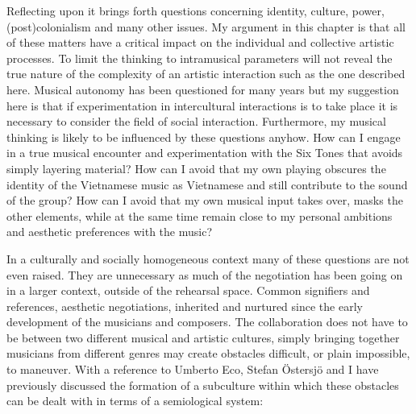 \documentclass[a4paper]{article}
\begin{document}
Reflecting upon it brings forth questions concerning identity, culture, power, (post)colonialism and many other issues. My argument in this chapter is that all of these matters have a critical impact on the individual and collective artistic processes. To limit the thinking to intramusical parameters will not reveal the true nature of the complexity of an artistic interaction such as the one described here. Musical autonomy has been questioned for many years but my suggestion here is that if experimentation in intercultural interactions is to take place it is necessary to consider the field of social interaction.
Furthermore, my musical thinking is likely to be influenced by these questions anyhow. How can I engage in a true musical encounter and experimentation with the Six Tones that avoids simply layering material?
How can I avoid that my own playing obscures the identity of the Vietnamese music as Vietnamese and still contribute to the sound of the group? How can I avoid that my own musical input takes over, masks the other elements, while at the same time remain close to my personal ambitions and aesthetic preferences with the music? 

In a culturally and socially homogeneous context many of these questions are not even raised. They are unnecessary as much of the negotiation has been going on in a larger context, outside of the rehearsal space. Common signifiers and references, aesthetic negotiations, inherited and nurtured since the early development of the musicians and composers. The collaboration does not have to be between two different musical and artistic cultures, simply bringing together musicians from different genres may create obstacles difficult, or plain impossible, to maneuver. With a reference to Umberto Eco, Stefan Östersjö and I have previously discussed the formation of a subculture within which these obstacles can be dealt with in terms of a semiological system:
\end{document}
